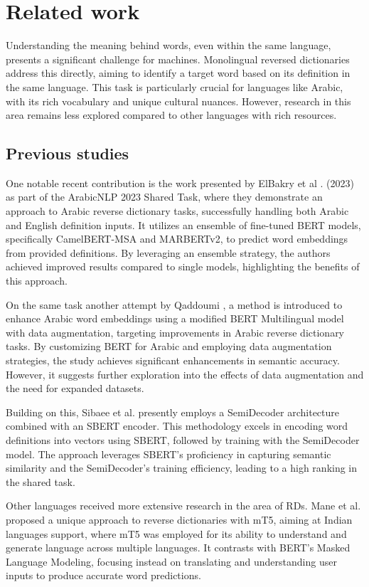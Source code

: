 \documentclass[15pt]{article}
\begin{document}
\section{Related work}

Understanding the meaning behind words, even within the same language, presents a significant challenge for machines. Monolingual reversed dictionaries address this directly, aiming to identify a target word based on its definition in the same language. This task is particularly crucial for languages like Arabic, with its rich vocabulary and unique cultural nuances. However, research in this area remains less explored compared to other languages with rich resources.

\subsection{Previous studies}

One notable recent contribution is the work presented by ElBakry et al \cite{Albakry2023}. (2023) as part of the ArabicNLP 2023 Shared Task, where they demonstrate an approach to Arabic reverse dictionary tasks, successfully handling both Arabic and English definition inputs. It utilizes an ensemble of fine-tuned BERT models, specifically CamelBERT-MSA and MARBERTv2, to predict word embeddings from provided definitions. By leveraging an ensemble strategy, the authors achieved improved results compared to single models, highlighting the benefits of this approach.

On the same task another attempt by Qaddoumi \cite{Qaddoumi2023}, a method is introduced to enhance Arabic word embeddings using a modified BERT Multilingual model with data augmentation, targeting improvements in Arabic reverse dictionary tasks. By customizing BERT for Arabic and employing data augmentation strategies, the study achieves significant enhancements in semantic accuracy. However, it suggests further exploration into the effects of data augmentation and the need for expanded datasets.

Building on this, Sibaee et al. \cite{Sibaee2023} presently employs a SemiDecoder architecture combined with an SBERT encoder. This methodology excels in encoding word definitions into vectors using SBERT, followed by training with the SemiDecoder model. The approach leverages SBERT's proficiency in capturing semantic similarity and the SemiDecoder's training efficiency, leading to a high ranking in the shared task.

Other languages received more extensive research in the area of RDs. Mane et al. \cite{Mane2022} proposed a unique approach to reverse dictionaries with mT5, aiming at Indian languages support, where mT5 was employed for its ability to understand and generate language across multiple languages. It contrasts with BERT's Masked Language Modeling, focusing instead on translating and understanding user inputs to produce accurate word predictions.
\end{document}
